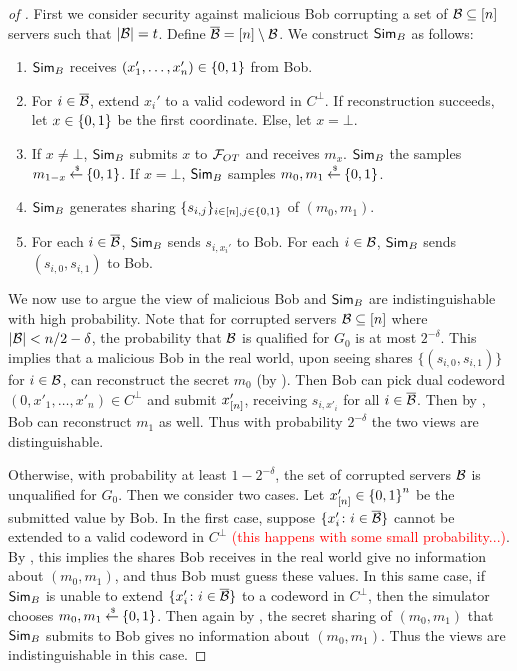 \begin{proof}[of ]
	First we consider security against malicious Bob corrupting a set of ${\mathcal B} \subseteq[n]$ servers such that $|{\mathcal B}| = t$.
	Define $\overline{{\mathcal B}} = [n]\setminus{\mathcal B}$.
	We construct $\mathsf{Sim}_B$ as follows:
	\begin{enumerate}
		\item $\mathsf{Sim}_B$ receives $(x_1',\dotsc, x_n') \in {\{0,1\}}$ from Bob.
		\item For $i \in \overline{{\mathcal B}}$, extend $x_i'$ to a valid codeword in $C^\perp$.
		If reconstruction succeeds, let $x \in {\{0,1\}}$ be the first coordinate.
		Else, let $x = \bot$.
		\item If $x \neq \bot$, $\mathsf{Sim}_B$ submits $x$ to ${\mathcal F}_{OT}$ and receives $m_x$.
		$\mathsf{Sim}_B$ the samples $m_{1-x} \mathbin{\stackrel{\mbox{\,\tiny \$}}{\gets}} {\{0,1\}}$.
		If $x = \bot$, $\mathsf{Sim}_B$ samples $m_0,m_1 \mathbin{\stackrel{\mbox{\,\tiny \$}}{\gets}} {\{0,1\}}$.
		\item $\mathsf{Sim}_B$ generates sharing $\{ s_{i,j} \}_{i \in [n], j \in {\{0,1\}}}$ of $(m_0, m_1)$.
		\item For each $i \in \overline{{\mathcal B}}$, $\mathsf{Sim}_B$ sends $s_{i, x_i'}$ to Bob.
		For each $i \in {\mathcal B}$, $\mathsf{Sim}_B$ sends $(s_{i,0}, s_{i,1})$ to Bob.
	\end{enumerate}
	We now use  to argue the view of malicious Bob and $\mathsf{Sim}_B$ are indistinguishable with high probability.
	Note that for corrupted servers ${\mathcal B} \subseteq [n]$ where $|{\mathcal B}| < n/2 - \delta$, the probability that ${\mathcal B}$ is qualified for $G_0$ is at most $2^{-\delta}$.
	This implies that a malicious Bob in the real world, upon seeing shares $\{ (s_{i,0}, s_{i,1}) \}$ for $i \in {\mathcal B}$, can reconstruct the secret $m_0$ (by ).
	Then Bob can pick dual codeword $(0, x'_1,\dotsc,x'_n) \in C^\perp$ and submit $x'_{[n]}$, receiving $s_{i, x'_i}$ for all $i \in \overline{{\mathcal B}}$.
	Then by , Bob can reconstruct $m_1$ as well.
	Thus with probability $2^{-\delta}$ the two views are distinguishable.
	
	Otherwise, with probability at least $1 - 2^{-\delta}$, the set of corrupted servers ${\mathcal B}$ is unqualified for $G_0$.
	Then we consider two cases.
	Let $x'_{[n]} \in {\{0,1\}}^n$ be the submitted value by Bob.
	In the first case, suppose $\{ x_i' \colon i \in \overline{{\mathcal B}} \}$ cannot be extended to a valid codeword in $C^\perp$ \textcolor{red}{(this happens with some small probability...)}.
	By , this implies the shares Bob receives in the real world give no information about $(m_0,m_1)$, and thus Bob must guess these values.
	In this same case, if $\mathsf{Sim}_B$ is unable to extend $\{ x_i' \colon i \in \overline{{\mathcal B}} \}$ to a codeword in $C^\perp$, then the simulator chooses $m_0, m_1 \mathbin{\stackrel{\mbox{\,\tiny \$}}{\gets}} {\{0,1\}}$.
	Then again by , the secret sharing of $(m_0, m_1)$ that $\mathsf{Sim}_B$ submits to Bob gives no information about $(m_0,m_1)$.
	Thus the views are indistinguishable in this case.
	

\end{proof}
